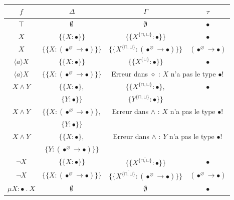 \documentclass{rapport}
\renewcommand{\emptyset}{\font\cmsy = cmsy10 at 10pt
 \hbox{\cmsy \char 59}
}
\theoremstyle{plain}
\theoremstyle{remark}
\theoremstyle{definition}
\begin{document}
\begin{table}[H]
    \center
    \renewcommand{\arraystretch}{2}
    \begin{tabular}[b]{|c|c||c|c|}
    \hline
  	{\huge{\textbf{$f$}}} & {\huge{\textbf{$\Delta$}}} & {\huge{\textbf{$\Gamma$}}} & {\huge{\textbf{$\tau$}}} \\ \hline
  	\hline
  	$\top$ & $\emptyset$ & $\emptyset$ & $\bullet$ \\
  	\hline
  	$X$ & $\{{\{X : \bullet\}}\}$ & $\{{\{X^{\{\sqcap, \sqcup\}} : \bullet\}}\}$ & $\bullet$ \\
 	\hline
 	$X$ & $\{{\{X : (\bullet^{\varnothing} \rightarrow \bullet)\}}\}$ & $\{{\{X^{\{\sqcap, \sqcup\}} : (\bullet^{\varnothing} \rightarrow \bullet)\}}\}$ & $(\bullet^{\varnothing} \rightarrow \bullet)$ \\
 	\hline
 	${\langle a \rangle X}$ & $\{{\{X : \bullet\}}\}$ & $\{{\{X^{\{\sqcup\}} : \bullet\}}\}$ & $\bullet$ \\
 	\hline
 	${\langle a \rangle X}$ & $\{{\{X : (\bullet^{\varnothing} \rightarrow \bullet)\}}\}$ & \multicolumn{2}{c|}{Erreur dans $\diamond$ : $X$ n'a pas le type $\bullet$!} \\
 	\hline
 	${X \wedge Y}$ & $\{{\{X : \bullet\}},$ & $\{{\{X^{\{\sqcap, \sqcup\}} : \bullet\}},$ & $\bullet$ \\
 	& ${\{Y : \bullet\}}\}$ & ${\{Y^{\{\sqcap, \sqcup\}} : \bullet\}}\}$ & \\
 	\hline
 	${X \wedge Y}$ & $\{{\{X : (\bullet^{\varnothing} \rightarrow \bullet)\}},$ & \multicolumn{2}{c|}{Erreur dans $\wedge$ : $X$ n'a pas le type $\bullet$!} \\
 	& ${\{Y : \bullet\}}\}$ & \multicolumn{2}{c|}{ } \\
 	\hline
 	${X \wedge Y}$ & $\{{\{X : \bullet\}},$ & \multicolumn{2}{c|}{Erreur dans $\wedge$ : $Y$ n'a pas le type $\bullet$!} \\
 	& ${\{Y : (\bullet^{\varnothing} \rightarrow \bullet)\}}\}$ & \multicolumn{2}{c|}{ } \\
 	\hline
 	${\neg X}$ & $\{{\{X : \bullet\}}\}$ & $\{{\{X^{\overline{\{\sqcap, \sqcup\}}} : \bullet\}}\}$ & $\bullet$ \\
 	\hline
 	${\neg X}$ & $\{{\{X : (\bullet^{\varnothing} \rightarrow \bullet)\}}\}$ & $\{{\{X^{\overline{\{\sqcap, \sqcup\}}} : (\bullet^{\varnothing} \rightarrow \bullet)\}}\}$ & $(\bullet^{\varnothing} \rightarrow \bullet)$ \\
 	\hline
 	$\mu X : \bullet \ . \ X$ & $\emptyset$ & $\emptyset$ & $\bullet$ \\

\end{tabular}
\end{table}
\end{document}
